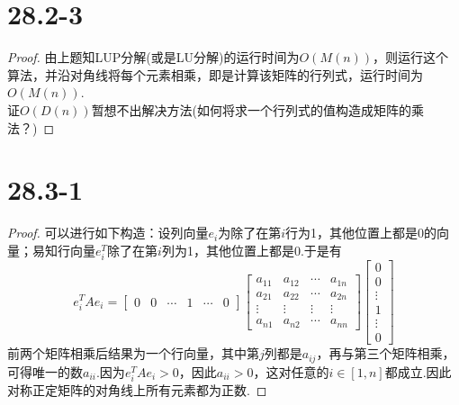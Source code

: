 \documentclass[twocolumn]{article}
\newenvironment{SChinese}{%
	\CJKfamily{gbsn}%
	\CJKtilde
	\CJKnospace}{}
\begin{document}
\begin{CJK}{UTF8}{}
\begin{SChinese}
			\section*{28.2-3}
				\begin{proof}
					由上题知LUP分解(或是LU分解)的运行时间为$O(M(n))$，则运行这个算法，并沿对角线将每个元素相乘，即是计算该矩阵的行列式，运行时间为$O(M(n))$.\\
			        证$O(D(n))$暂想不出解决方法(如何将求一个行列式的值构造成矩阵的乘法？)
				\end{proof}
			\section*{28.3-1}
				\begin{proof}
					可以进行如下构造：设列向量$e_i$为除了在第$i$行为1，其他位置上都是0的向量；易知行向量$e_i^T$除了在第$i$列为1，其他位置上都是0.于是有\begin{displaymath}
						e_i^TAe_i=\left [\begin{matrix}
						0 & 0 & \cdots & 1 & \cdots & 0
						\end{matrix}\right]\left [\begin{matrix}
						a_{11} & a_{12} & \cdots & a_{1n} \\
						a_{21} & a_{22} & \cdots & a_{2n} \\
						\vdots & \vdots & \vdots & \vdots \\
						a_{n1} & a_{n2} & \cdots & a_{nn}
						\end{matrix}\right]\left [\begin{matrix}
						0 \\ 0 \\ \vdots \\ 1 \\ \vdots \\ 0
						\end{matrix}\right] 
					\end{displaymath}
					前两个矩阵相乘后结果为一个行向量，其中第$j$列都是$a_{ij}$，再与第三个矩阵相乘，可得唯一的数$a_{ii}$.因为$e_i^TAe_i>0$，因此$a_{ii}>0$，这对任意的$i\in [1,n]$都成立.因此对称正定矩阵的对角线上所有元素都为正数.
				\end{proof}

\end{SChinese}
\end{CJK}
\end{document}
